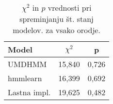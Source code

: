 \begin{table}
\centering
\begin{tabular}{l c c}
\toprule
{\bf Model} & {\bf $\chi^2$} & {\bf p} \\
\midrule
UMDHMM        & 15,840 & 0,726 \\
hmmlearn      & 16,399 & 0,692 \\
Lastna impl.  & 19,625 & 0,482 \\
\bottomrule
\end{tabular}
\caption{$\chi^2$ in $p$ vrednosti pri spreminjanju št. stanj modelov. za vsako
orodje.}
\label{tab:bench:state_comparison}
\end{table}
